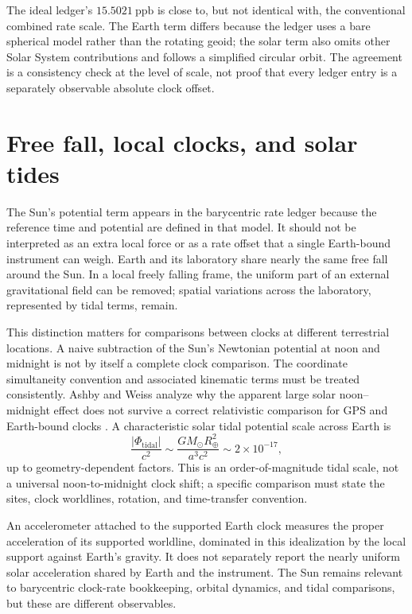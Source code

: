 \documentclass[12pt]{article}
\begin{document}
The ideal ledger's $15.5021\ \mathrm{ppb}$ is close to, but not identical with, the conventional combined rate scale. The Earth term differs because the ledger uses a bare spherical model rather than the rotating geoid; the solar term also omits other Solar System contributions and follows a simplified circular orbit. The agreement is a consistency check at the level of scale, not proof that every ledger entry is a separately observable absolute clock offset.

\section{Free fall, local clocks, and solar tides}

The Sun's potential term appears in the barycentric rate ledger because the reference time and potential are defined in that model. It should not be interpreted as an extra local force or as a rate offset that a single Earth-bound instrument can weigh. Earth and its laboratory share nearly the same free fall around the Sun. In a local freely falling frame, the uniform part of an external gravitational field can be removed; spatial variations across the laboratory, represented by tidal terms, remain.

This distinction matters for comparisons between clocks at different terrestrial locations. A naive subtraction of the Sun's Newtonian potential at noon and midnight is not by itself a complete clock comparison. The coordinate simultaneity convention and associated kinematic terms must be treated consistently. Ashby and Weiss analyze why the apparent large solar noon--midnight effect does not survive a correct relativistic comparison for GPS and Earth-bound clocks \cite{AshbyWeiss2013}. A characteristic solar tidal potential scale across Earth is
\begin{equation}
  \frac{|\Phi_{\mathrm{tidal}}|}{c^2}
  \sim\frac{GM_{\odot}R_{\oplus}^2}{a^3c^2}
  \sim2\times10^{-17},
  \label{eq:tidal-scale}
\end{equation}
up to geometry-dependent factors. This is an order-of-magnitude tidal scale, not a universal noon-to-midnight clock shift; a specific comparison must state the sites, clock worldlines, rotation, and time-transfer convention.

An accelerometer attached to the supported Earth clock measures the proper acceleration of its supported worldline, dominated in this idealization by the local support against Earth's gravity. It does not separately report the nearly uniform solar acceleration shared by Earth and the instrument. The Sun remains relevant to barycentric clock-rate bookkeeping, orbital dynamics, and tidal comparisons, but these are different observables.
\end{document}
